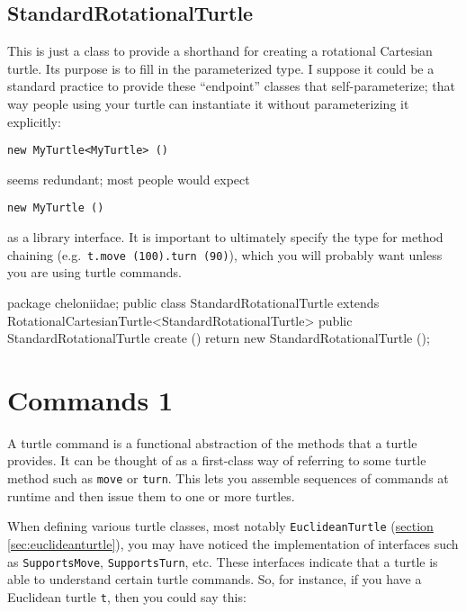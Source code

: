 \documentclass{report}
\newcommand{\Ref}[2]{\hyperref[#2]{#1 \ref*{#2}}}
\begin{document}
\section {StandardRotationalTurtle} \label{sec:standardrotationalturtle}
      This is just a class to provide a shorthand for creating a rotational Cartesian turtle. Its purpose is to fill in the parameterized type. I suppose it
      could be a standard practice to provide these ``endpoint'' classes that self-parameterize; that way people using your turtle can instantiate it without
      parameterizing it explicitly:

\begin{verbatim}
new MyTurtle<MyTurtle> ()
\end{verbatim}

      \noindent seems redundant; most people would expect

\begin{verbatim}
new MyTurtle ()
\end{verbatim}

      \noindent as a library interface. It is important to ultimately specify the type for method chaining (e.g.~\verb|t.move (100).turn (90)|), which you will
      probably want unless you are using turtle commands.

\begin{javacode}
package cheloniidae;
public class StandardRotationalTurtle extends RotationalCartesianTurtle<StandardRotationalTurtle> {
  public StandardRotationalTurtle create () {return new StandardRotationalTurtle ();}
}
\end{javacode}

\chapter {Commands 1} \label{sec:commands-1}
    A turtle command is a functional abstraction of the methods that a turtle provides. It can be thought of as a first-class way of referring to some turtle
    method such as {\tt move} or {\tt turn}. This lets you assemble sequences of commands at runtime and then issue them to one or more turtles.

    When defining various turtle classes, most notably {\tt EuclideanTurtle} (\Ref{section}{sec:euclideanturtle}), you may have noticed the implementation of
    interfaces such as {\tt SupportsMove}, {\tt SupportsTurn}, etc. These interfaces indicate that a turtle is able to understand certain turtle commands. So,
    for instance, if you have a Euclidean turtle {\tt t}, then you could say this:
\end{document}
